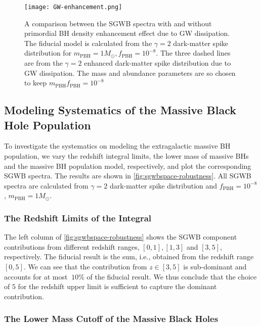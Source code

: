 \begin{figure*}[htbp]
   \centering
   \texttt{[image: GW-enhancement.png]}
\caption{ A comparison between the \ac{SGWB} spectra with and without primordial \ac{BH} density enhancement effect due to \ac{GW} dissipation.
The fiducial model is calculated from the $\gamma=2$ dark-matter spike distribution for $m_\mathrm{PBH} = 1 M_\odot, f_\mathrm{PBH} = 10^{-8}$.
The three dashed lines are from the $\gamma=2$ enhanced dark-matter spike distribution due to \ac{GW} dissipation.
The mass and abundance parameters are so chosen to keep $m_\mathrm{PBH}f_\mathrm{PBH} = 10^{-8}$
}\label{fig:GWenhance}
\end{figure*}



\subsection{Modeling Systematics of the Massive Black Hole Population}\label{sec:robust}

To investigate the systematics on modeling the extragalactic massive \ac{BH} population, we vary the redshift integral limits, the lower mass of massive \acp{BH} and the massive \ac{BH} population model, respectively, and plot the corresponding \ac{SGWB} spectra.
The results are shown in \cref{fig:sgwbspace-robustness}. 
All \ac{SGWB} spectra are calculated from $\gamma=2$ dark-matter spike distribution and $f_\text{PBH} = 10^{-8}$, $m_\text{PBH} = 1 M_\odot$.

\subsubsection{The Redshift Limits of the Integral}

The left column of \cref{fig:sgwbspace-robustness} shows the \ac{SGWB} component contributions from different redshift ranges, $[0,1], [1,3]$ and $[3,5]$, respectively.
The fiducial result is the sum, i.e., obtained from the redshift range $[0,5]$.
We can see that the contribution from $z\in [3,5]$ is sub-dominant and accounts for at most $~10\%$ of the fiducial result.
We thus conclude that the choice of $5$ for the redshift upper limit is sufficient to capture the dominant contribution.

\subsubsection{The Lower Mass Cutoff of the Massive Black Holes}

